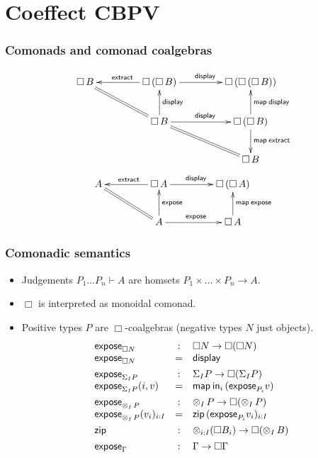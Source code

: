 \documentclass[t,fleqn,usenames,dvipsnames]{beamer}
\begin{document}
\section{Coeffect CBPV}

\newcommand{\textract}{\mathsf{extract}}

\begin{frame}%
  \frametitle{Comonads and comonad coalgebras}
\renewcommand{\D}{\Box}
\[
\xymatrix@C=10ex{
\D\,B  \ar@{=}[dr]
  & \D\,(\D\,B) \ar[l]_{\textract} \ar[r]^{\tdisplay}
  & \D\,(\D\,(\D\,B))
\\
  & \D\,B \ar[u]_{\tdisplay} \ar[r]^{\tdisplay} \ar@{=}[dr]
  & \D\,(\D\,B) \ar[u]_{\tmap\,\tdisplay} \ar[d]^{\tmap\,\textract}
\\
  &
  & \D\,B
}
\]
\[
\xymatrix@C=10ex{
A  \ar@{=}[dr]
  & \D\,A \ar[l]_{\textract} \ar[r]^{\tdisplay}
  & \D\,(\D\,A)
\\
  & A \ar[u]_{\texpose} \ar[r]^{\texpose}
  & \D\,A \ar[u]_{\tmap\,\texpose}
}
\]
\end{frame}


\begin{frame}[fragile=singleslide]
  \frametitle{Comonadic semantics}
  \begin{itemize}
  \item Judgements $P_1 \ldots P_n \vdash A$ are homsets $P_1 \times \ldots \times P_n \to A$.
  \item $\Box$ is interpreted as monoidal comonad.
  \item Positive types $P$ are $\Box$-coalgebras (negative types $N$ just objects).
\[
\begin{array}{lcl}
  \mathsf{expose}_{\Box N} & : & \Box N \to \Box (\Box N) \\
  \mathsf{expose}_{\Box N} & = & \mathsf{display} \\[1ex]
  \mathsf{expose}_{\Sigma_{I} P} & : & \Sigma_{I} P \to \Box (\Sigma_{I} P) \\
  \mathsf{expose}_{\Sigma_{I} P} (i, v) & = & \mathsf{map}^{}\,\mathsf{in}_i\, (\mathsf{expose}_{P_i} v) \\[1ex]
  \mathsf{expose}_{\mathop\otimes_{I} P} & : & \mathop\otimes_{I} P \to \Box(\mathop\otimes_{I} P) \\
  \mathsf{expose}_{\mathop\otimes_{I} P} (v_i)_{i:I} & = & \mathsf{zip}\, (\mathsf{expose}_{P_i} v_i)_{i:I} \\[1ex]
  \mathsf{zip} & : & \mathop\otimes_{i:I} (\Box {B_i}) \to \Box (\mathop\otimes_{I} B) \\[1ex]
  \mathsf{expose}_\Gamma & : & \Gamma \to \Box \Gamma \\[1ex]
\end{array}
\]
  \end{itemize}
\end{frame}
\end{document}

